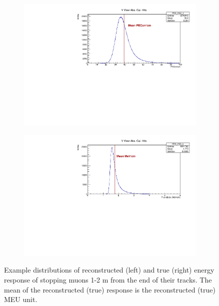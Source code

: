 \documentclass[12pt,a4paper]{article}
\begin{document}
\begin{figure}[!hbtp]
\centering
\begin{subfigure}[b]{0.495\textwidth}
\centering
\includegraphics[width=\textwidth]{Plots/Period4_nhits_meu_y.pdf}
\end{subfigure}
\begin{subfigure}[b]{0.495\textwidth}
\centering
\includegraphics[width=\textwidth]{Plots/MC_nhits_mev_y.pdf}
\end{subfigure}
\caption{Example distributions of reconstructed (left) and true (right) energy response of stopping muons 1-2 m from the end of their tracks. The mean of the reconstructed (true) response is the reconstructed (true) MEU unit.}
\label{figAbsCalibMEU}
\end{figure}
\end{document}
